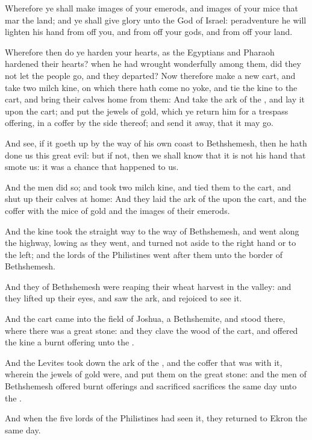 \Verse Wherefore ye shall make images of your emerods, and images of your mice that mar the land; and ye shall give glory unto the God of Israel: peradventure he will lighten his hand from off you, and from off your gods, and from off your land.

\Verse Wherefore then do ye harden your hearts, as the Egyptians and Pharaoh hardened their hearts? when he had wrought wonderfully among them, did they not let the people go, and they departed?  \Verse Now therefore make a new cart, and take two milch kine, on which there hath come no yoke, and tie the kine to the cart, and bring their calves home from them: \Verse And take the ark of the \LORD, and lay it upon the cart; and put the jewels of gold, which ye return him for a trespass offering, in a coffer by the side thereof; and send it away, that it may go.

\Verse And see, if it goeth up by the way of his own coast to Bethshemesh, then he hath done us this great evil: but if not, then we shall know that it is not his hand that smote us: it was a chance that happened to us.

\Verse And the men did so; and took two milch kine, and tied them to the cart, and shut up their calves at home: \Verse And they laid the ark of the \LORD upon the cart, and the coffer with the mice of gold and the images of their emerods.

\Verse And the kine took the straight way to the way of Bethshemesh, and went along the highway, lowing as they went, and turned not aside to the right hand or to the left; and the lords of the Philistines went after them unto the border of Bethshemesh.

\Verse And they of Bethshemesh were reaping their wheat harvest in the valley: and they lifted up their eyes, and saw the ark, and rejoiced to see it.

\Verse And the cart came into the field of Joshua, a Bethshemite, and stood there, where there was a great stone: and they clave the wood of the cart, and offered the kine a burnt offering unto the \LORD.

\Verse And the Levites took down the ark of the \LORD, and the coffer that was with it, wherein the jewels of gold were, and put them on the great stone: and the men of Bethshemesh offered burnt offerings and sacrificed sacrifices the same day unto the \LORD.

\Verse And when the five lords of the Philistines had seen it, they returned to Ekron the same day.

